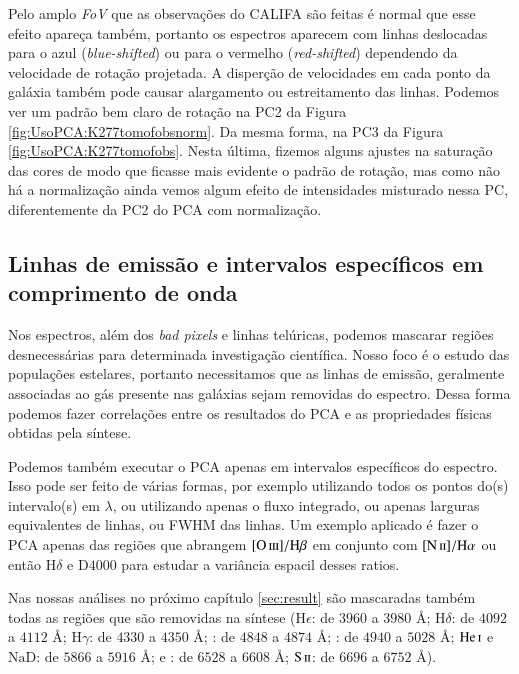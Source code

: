 Pelo amplo {\em FoV} que as observações do CALIFA são feitas é normal que esse efeito apareça também, portanto os
espectros aparecem com linhas deslocadas para o azul ({\em blue-shifted}) ou para o vermelho ({\em red-shifted})
dependendo da velocidade de rotação projetada. A disperção de velocidades em cada ponto da galáxia também pode causar
alargamento ou estreitamento das linhas. Podemos ver um padrão bem claro de rotação na PC2 da Figura
\ref{fig:UsoPCA:K277tomofobsnorm}. Da mesma forma, na PC3 da Figura \ref{fig:UsoPCA:K277tomofobs}. Nesta última, fizemos
alguns ajustes na saturação das cores de modo que ficasse mais evidente o padrão de rotação, mas como não há a
normalização ainda vemos algum efeito de intensidades misturado nessa PC, diferentemente da PC2 do PCA com normalização.

\subsection{Linhas de emissão e intervalos específicos em comprimento de onda}
\label{sec:UsoPCA:PCAlidades:emlin}

Nos espectros, além dos {\em bad pixels} e linhas telúricas, podemos mascarar regiões desnecessárias para determinada
investigação científica. Nosso foco é o estudo das populações estelares, portanto necessitamos que as linhas de emissão,
geralmente associadas ao gás presente nas galáxias \fixme sejam removidas do espectro. Dessa forma podemos fazer
correlações entre os resultados do PCA e as propriedades físicas obtidas pela síntese.

Podemos também executar o PCA apenas em intervalos específicos do espectro. Isso pode ser feito de várias formas, por
exemplo utilizando todos os pontos do(s) intervalo(s) em $\lambda$, ou utilizando apenas o fluxo integrado, ou apenas
larguras equivalentes de linhas, ou FWHM das linhas. Um exemplo aplicado é fazer o PCA apenas das regiões que abrangem
$\oIII/\Hbeta$ em conjunto com $\nII/\Halpha$ ou então $\mathrm{H}\delta$ e D$4000$ para estudar a variância espacil
desses ratios.

Nas nossas análises no próximo capítulo \ref{sec:result} são mascaradas também todas as regiões que são removidas na
síntese ($\mathrm{H}\epsilon$: de $3960$ a $3980$ \AA; $\mathrm{H}\delta$: de $4092$ a $4112$ \AA; $\mathrm{H}\gamma$:
de $4330$ a $4350$ \AA; \Hbeta: de $4848$ a $4874$ \AA; \oIII: de $4940$ a $5028$ \AA; $\mathrm{He\,\textsc{i}}$ e
$\mathrm{NaD}$: de $5866$ a $5916$ \AA; \Halpha e \nII: de $6528$ a $6608$ \AA; $\mathrm{S\,\textsc{ii}}$: de $6696$ a
$6752$ \AA).

